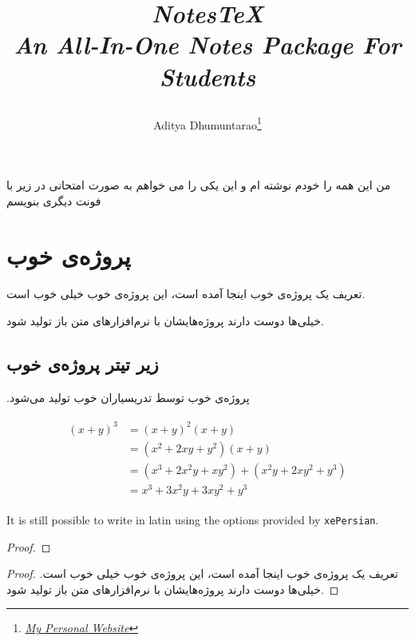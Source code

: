 \documentclass[10pt,twoside]{article}
\title{\begin{center}{\Huge \textit{NotesTeX}}\\{{\itshape An All-In-One Notes Package For Students}}\end{center}}
\author{Aditya Dhumuntarao\footnote{\href{https://geodesick.com/}{\textit{My Personal Website}}}}
\begin{document}
\pagestyle{fancynotes}
\noindent من این همه را خودم نوشته ام و این یکی را می خواهم به صورت امتحانی در زیر با فونت 
دیگری بنویسم 

\section{پروژه‌ی خوب}
\par
تعریف یک پروژه‌ی خوب اینجا آمده است، این پروژه‌ی خوب خیلی خوب است. 

خیلی‌ها دوست دارند پروژه‌هایشان با نرم‌افزارهای متن باز تولید شود.

\subsection{زیر تیتر پروژه‌ی خوب}
\par
.پروژه‌ی خوب توسط تدریسیاران خوب تولید می‌شود

\begin{align}
\begin{split}
(x+y)^3 &= (x+y)^2(x+y)\\
&=(x^2+2xy+y^2)(x+y)\\
&=(x^3+2x^2y+xy^2) + (x^2y+2xy^2+y^3)\\
&=x^3+3x^2y+3xy^2+y^3
\end{split}					
\end{align}

\begin{latin}
	It is still possible to write in latin using the options provided by \texttt{xePersian}.

	\begin{proof}
	\lipsum[1]
	\end{proof}
\end{latin}

\begin{proof}
	تعریف یک پروژه‌ی خوب اینجا آمده است، این پروژه‌ی خوب خیلی خوب است.
	خیلی‌ها دوست دارند پروژه‌هایشان با نرم‌افزارهای متن باز تولید شود.
\end{proof}
\end{document}
